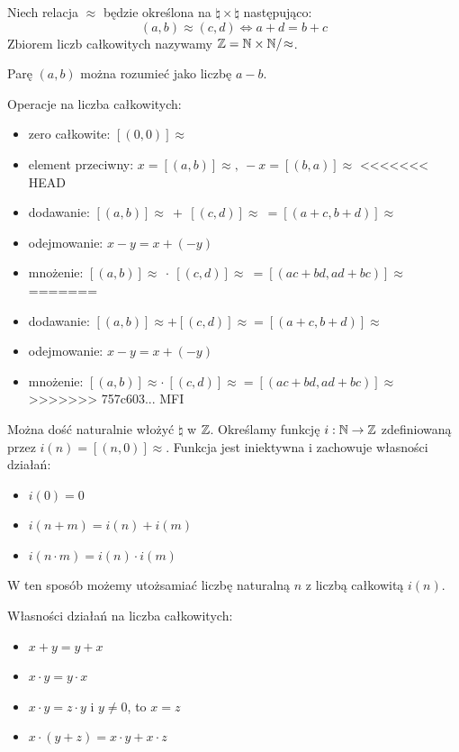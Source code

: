 \begin{definition}
    Niech relacja \( \approx \) będzie określona na \( \natural \times \natural \) następująco:
    \[
        (a, b) \approx (c, d) \iff a + d = b + c
    \]
    Zbiorem liczb całkowitych nazywamy \( \mathbb{Z} = \mathbb{N} \times \mathbb{N} /\!\approx \).
\end{definition}
Parę \( (a, b) \) można rozumieć jako liczbę \( a - b \).

Operacje na liczba całkowitych:
\begin{itemize}
    \item zero całkowite: \( [(0, 0)]\!\approx \)
    \item element przeciwny: \( x = [(a, b)]\!\approx, \ -x = [(b, a)]\!\approx \)
<<<<<<< HEAD
    \item dodawanie: \( [(a, b)]\!\approx \: + \: [(c, d)]\!\approx \: = [(a + c, b + d)]\!\approx \)
    \item odejmowanie: \( x - y = x + (-y) \)
    \item mnożenie: \( [(a, b)]\!\approx \: \cdot \: [(c, d)]\!\approx \: = [(ac + bd, ad + bc)]\!\approx \)
=======
    \item dodawanie: \( [(a, b)]\!\approx + [(c, d)]\!\approx = [(a + c, b + d)]\!\approx \)
    \item odejmowanie: \( x - y = x + (-y) \)
    \item mnożenie: \( [(a, b)]\!\approx \cdot\: [(c, d)]\!\approx = [(ac + bd, ad + bc)]\!\approx \)
>>>>>>> 757c603... MFI
\end{itemize}

Można dość naturalnie włożyć \( \natural \) w \( \mathbb{Z} \). Określamy funkcję \( i : \mathbb{N} \rightarrow \mathbb{Z} \) zdefiniowaną przez \( i(n) = [(n, 0)]\!\approx \).
Funkcja jest iniektywna i zachowuje własności działań:
\begin{itemize}
    \item \( i(0) = 0 \)
    \item \( i(n + m) = i(n) + i(m) \)
    \item \( i(n \cdot m) = i(n) \cdot i(m) \)
\end{itemize}
W ten sposób możemy utożsamiać liczbę naturalną \( n \) z liczbą całkowitą \( i(n) \).

Własności działań na liczba całkowitych:
\begin{itemize}
    \item \( x + y = y + x \)
    \item \( x \cdot y = y \cdot x \)
    \item \( x \cdot y = z \cdot y \) i \( y \ne 0 \), to \( x = z \)
    \item \( x \cdot (y + z) = x \cdot y + x \cdot z \)
\end{itemize}